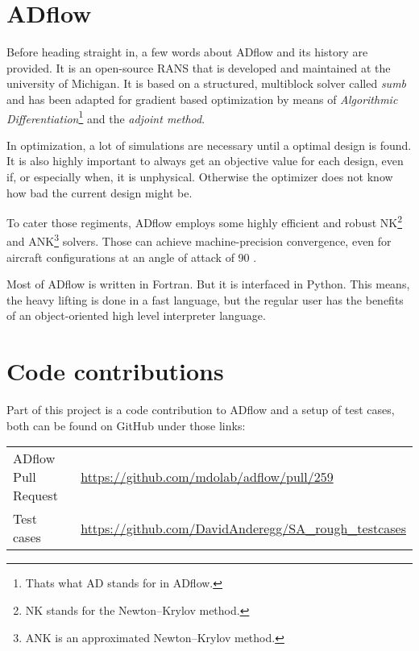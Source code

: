 \section{ADflow}
Before heading straight in, a few words about ADflow and its history are
provided. It is an open-source RANS that is developed and maintained at the
university of Michigan. It is based on a structured, multiblock solver called
\textit{sumb} and has been adapted for gradient based optimization by means of
\textit{Algorithmic Differentiation}\footnote{Thats what AD stands for in
ADflow.} and the \textit{adjoint method}.

In optimization, a lot of simulations are necessary until a optimal design is
found. It is also highly important to always get an objective value for each
design, even if, or especially when, it is unphysical. Otherwise the optimizer
does not know how bad the current design might be.


To cater those regiments, ADflow employs some highly efficient and robust
NK\footnote{NK stands for the Newton–Krylov method.} and ANK\footnote{ANK is an
approximated Newton–Krylov method.} solvers. Those can achieve machine-precision
convergence, even for aircraft configurations at an angle of attack of 90\degree
\cite{Mader2020a} \cite{Kenway2019a} \cite{Yildirim2019b}.


Most of ADflow is written in Fortran. But it is interfaced in Python. This means,
the heavy lifting is done in a fast language, but the regular user has the
benefits of an object-oriented high level interpreter language.

\section{Code contributions}
Part of this project is a code contribution to ADflow and a setup of test cases,
both can be found on GitHub under those links:\\


\begin{tabular}{l l}
  ADflow Pull Request & \url{https://github.com/mdolab/adflow/pull/259} \\
  Test cases & \url{https://github.com/DavidAnderegg/SA_rough_testcases}
\end{tabular}
